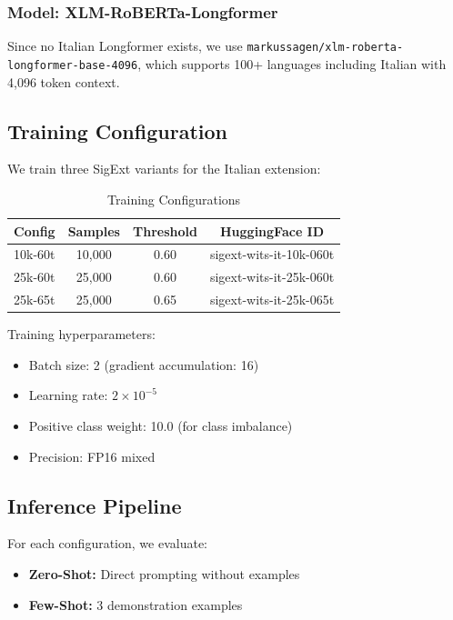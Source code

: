 \documentclass[conference]{IEEEtran}
\begin{document}
\subsubsection{Model: XLM-RoBERTa-Longformer}
Since no Italian Longformer exists, we use \texttt{markussagen/xlm-roberta-longformer-base-4096}, which supports 100+ languages including Italian with 4,096 token context.

\subsection{Training Configuration}

We train three SigExt variants for the Italian extension:

\begin{table}[htbp]
\caption{Training Configurations}
\begin{center}
\begin{tabular}{lccc}
\toprule
\textbf{Config} & \textbf{Samples} & \textbf{Threshold} & \textbf{HuggingFace ID} \\
\midrule
10k-60t & 10,000 & 0.60 & sigext-wits-it-10k-060t \\
25k-60t & 25,000 & 0.60 & sigext-wits-it-25k-060t \\
25k-65t & 25,000 & 0.65 & sigext-wits-it-25k-065t \\
\bottomrule
\end{tabular}
\label{tab:configs}
\end{center}
\end{table}

Training hyperparameters:
\begin{itemize}
    \item Batch size: 2 (gradient accumulation: 16)
    \item Learning rate: $2 \times 10^{-5}$
    \item Positive class weight: 10.0 (for class imbalance)
    \item Precision: FP16 mixed
\end{itemize}

\subsection{Inference Pipeline}

For each configuration, we evaluate:
\begin{itemize}
    \item \textbf{Zero-Shot:} Direct prompting without examples
    \item \textbf{Few-Shot:} 3 demonstration examples
\end{itemize}
\end{document}
